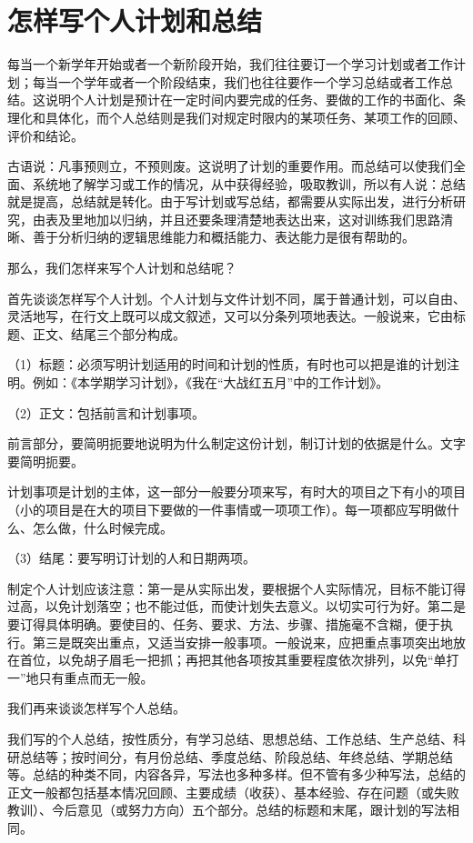 \section{怎样写个人计划和总结}

每当一个新学年开始或者一个新阶段开始，我们往往要订一个学习计划或者工作计划；每当一个学年或者一个阶段结束，我们也往往要作一个学习总结或者工作总结。这说明个人计划是预计在一定时间内要完成的任务、要做的工作的书面化、条理化和具体化，而个人总结则是我们对规定时限内的某项任务、某项工作的回顾、评价和结论。

古语说：凡事预则立，不预则废。这说明了计划的重要作用。而总结可以使我们全面、系统地了解学习或工作的情况，从中获得经验，吸取教训，所以有人说：总结就是提高，总结就是转化。由于写计划或写总结，都需要从实际出发，进行分析研究，由表及里地加以归纳，并且还要条理清楚地表达出来，这对训练我们思路清晰、善于分析归纳的逻辑思维能力和概括能力、表达能力是很有帮助的。

那么，我们怎样来写个人计划和总结呢？

首先谈谈怎样写个人计划。个人计划与文件计划不同，属于普通计划，可以自由、灵活地写，在行文上既可以成文叙述，又可以分条列项地表达。一般说来，它由标题、正文、结尾三个部分构成。

（1）标题：必须写明计划适用的时间和计划的性质，有时也可以把是谁的计划注明。例如：《本学期学习计划》，《我在“大战红五月”中的工作计划》。

（2）正文：包括前言和计划事项。

前言部分，要简明扼要地说明为什么制定这份计划，制订计划的依据是什么。文字要简明扼要。

计划事项是计划的主体，这一部分一般要分项来写，有时大的项目之下有小的项目（小的项目是在大的项目下要做的一件事情或一项项工作）。每一项都应写明做什么、怎么做，什么时候完成。

（3）结尾：要写明订计划的人和日期两项。

制定个人计划应该注意：第一是从实际出发，要根据个人实际情况，目标不能订得过高，以免计划落空；也不能过低，而使计划失去意义。以切实可行为好。第二是要订得具体明确。要使目的、任务、要求、方法、步骤、措施毫不含糊，便于执行。第三是既突出重点，又适当安排一般事项。一般说来，应把重点事项突出地放在首位，以免胡子眉毛一把抓；再把其他各项按其重要程度依次排列，以免“单打一”地只有重点而无一般。

我们再来谈谈怎样写个人总结。

我们写的个人总结，按性质分，有学习总结、思想总结、工作总结、生产总结、科研总结等；按时间分，有月份总结、季度总结、阶段总结、年终总结、学期总结等。总结的种类不同，内容各异，写法也多种多样。但不管有多少种写法，总结的正文一般都包括基本情况回顾、主要成绩（收获）、基本经验、存在问题（或失败教训）、今后意见（或努力方向）五个部分。总结的标题和末尾，跟计划的写法相同。

